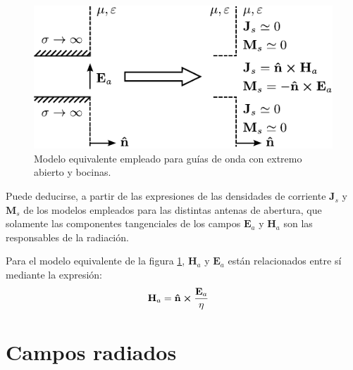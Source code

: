 \begin{figure} [H]
\centering 
\includegraphics[scale = 1]{Figures/Fundamentos/fundamentos_10.pdf}
\caption{Modelo equivalente empleado para guías de onda con extremo abierto y bocinas.}
\label{fig_fundamentos:10}
\end{figure}
Puede deducirse, a partir de las expresiones de las densidades de corriente $\mathbf{J}_s$ y $\mathbf{M}_s$ de los modelos empleados para las distintas antenas de abertura, que solamente las componentes tangenciales de los campos $\mathbf{E}_a$ y $\mathbf{H}_a$ son las responsables de la radiación.

Para el modelo equivalente de la figura \ref{fig_fundamentos:10}, $\mathbf{H}_a$ y $\mathbf{E}_a$ están relacionados entre sí mediante la expresión:
\begin{align}
&\mathbf{H}_a = \bm{\mathbf{\hat{n}}}\boldsymbol{\times}\frac{\mathbf{E}_a}{\eta}
\label{ec_fundamentos:32}
\end{align}

\section{Campos radiados}
\label{sec_fundamentos_campos}

